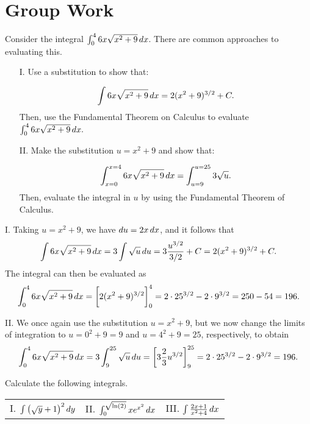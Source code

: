 \documentclass[handout]{ximera}
\begin{document}
\section{Group Work}

\begin{problem}
Consider the integral $\int_0^4  6x\sqrt{x^2+9} \mathop{}\!d x$.  There are common approaches to evaluating this.

\begin{itemize}
\item[I.] Use a substitution to show that:

\[\int  6x\sqrt{x^2+9} \mathop{}\!d x = 2 (x^2 + 9)^{3/2} + C.\]  
Then, use the Fundamental Theorem on Calculus to evaluate $\int_0^4  6x\sqrt{x^2+9} \mathop{}\!d x.$ 

\item[II.] Make the substitution $u=x^2+9$ and show that:

\[\int_{x=0}^{x=4}  6x\sqrt{x^2+9} \mathop{}\!d x = \int_{u=9}^{u=25} 3\sqrt{u}.\]  Then, evaluate the integral in $u$ by using the Fundamental Theorem of Calculus.
\end{itemize}
\end{problem}

\begin{freeResponse} I. Taking $u=x^2 + 9$, we have $\mathop{}\!d u = 2 x \mathop{}\!d x$, and it follows that
$$
\int  6x\sqrt{x^2+9} \mathop{}\!d x = 3 \int \sqrt{u} \mathop{}\!d u = 3 \frac{u^{3/2}}{3/2} + C = 2 (x^2 + 9)^{3/2} + C. 
$$
The integral can then be evaluated as 
$$
\int_0^4  6x\sqrt{x^2+9} \mathop{}\!d x = \bigg[ 2 (x^2 + 9)^{3/2} \bigg]_0^4 = 2 \cdot 25^{3/2} - 2 \cdot 9^{3/2} = 250 - 54 = 196.
$$

II. We once again use the substitution $u=x^2 + 9$, but we now change the limits of integration to $u=0^2+9=9$ and $u=4^2+9 = 25$, respectively, to obtain
$$
\int_0^4  6x\sqrt{x^2+9} \mathop{}\!d x = 3 \int_9^{25} \sqrt{u} \mathop{}\!d u = \bigg[ 3 \frac{2}{3} u^{3/2} \bigg]_9^{25} = 2 \cdot 25^{3/2} - 2 \cdot 9^{3/2} = 196.
$$
\end{freeResponse}

\begin{problem}
Calculate the following integrals.

\begin{tabular}{lll}
I.  $\int \left(\sqrt{y}+1\right)^2 \mathop{}\!d y$ \hspace{.5in} & II. $\int_0^{\sqrt{\ln(2)}} x e^{x^2} \mathop{}\!d x$ \hspace{.5in} & III. $\int \frac{2x+1}{x^2+4} \mathop{}\!d x$ \hspace{.05in}
\end{tabular}

\end{problem}
\end{document}
